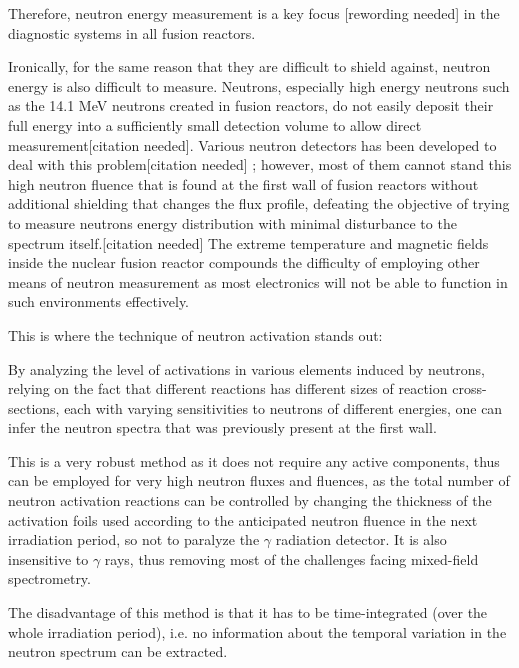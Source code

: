 \documentclass[a4paper, 12pt]{article}
\begin{document}
Therefore, neutron energy measurement is a key focus [rewording needed] in the diagnostic systems in all fusion reactors.

Ironically, for the same reason that they are difficult to shield against, neutron energy is also difficult to measure. Neutrons, especially high energy neutrons such as the 14.1 MeV neutrons created in fusion reactors, do not easily deposit their full energy into a sufficiently small detection volume to allow direct measurement[citation needed]. Various neutron detectors has been developed to deal with this problem[citation needed] ;%
however, most of them cannot stand this high neutron fluence that is found at the first wall of fusion reactors without additional shielding that changes the flux profile, defeating the objective of trying to measure neutrons energy distribution with minimal disturbance to the spectrum itself.[citation needed]
The extreme temperature and magnetic fields inside the nuclear fusion reactor compounds the difficulty of employing other means of neutron measurement as most electronics will not be able to function in such environments effectively. \cite{CCDCameraDamage}

This is where the technique of neutron activation stands out: 

By analyzing the level of activations in various elements induced by neutrons, relying on the fact that different reactions has different sizes of reaction cross-sections, each with varying sensitivities to neutrons of different energies, one can infer the neutron spectra that was previously present at the first wall.

This is a very robust method as it does not require any active components, thus can be employed for very high neutron fluxes and fluences\cite{NSpecHistoricalReviewAndPresentStatus}, as the total number of neutron activation reactions can be controlled by changing the thickness of the activation foils used \cite{bethColling_TBMD} according to the anticipated neutron fluence in the next irradiation period, so not to paralyze the $\gamma$ radiation detector. It is also insensitive to $\gamma$ rays, thus removing most of the challenges facing mixed-field spectrometry. \cite{NeutronSpectrometryInMixedFieldsMultiSphereSpectrometers}

The disadvantage of this method is that it has to be time-integrated (over the whole irradiation period), i.e. no information about the temporal variation in the neutron spectrum can be extracted.
\end{document}
